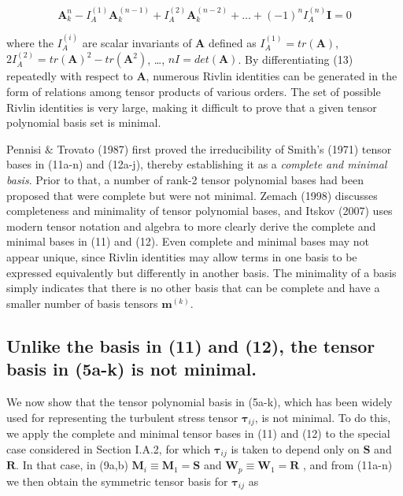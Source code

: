 %
\begin{equation}
	\label{E:30}
	\mathbf{A}^n_k - I^{(1)}_A \mathbf{A}^{(n-1)}_k + I^{(2)}_A \mathbf{A}^{(n-2)}_k
	+ \ldots + (-1)^{n}I^{(n)}_A \mathbf{I} = 0
\end{equation}
%
%   


where the  $I^{(i)}_{A}$ are scalar invariants of $\mathbf{A}$ defined as  $I^{(1)}_{A} = tr(\mathbf{A})$, $2I^{(2)}_{A} = tr(\mathbf{A})^2- tr(\mathbf{A}^2)$, \ldots , $nI = det(\mathbf{A})$. By differentiating (13) repeatedly with respect to $\mathbf{A}$, numerous Rivlin identities can be generated in the form of relations among tensor products of various orders. The set of possible Rivlin identities is very large, making it difficult to prove that a given tensor polynomial basis set is minimal. 

Pennisi $\&$ Trovato (1987) first proved the irreducibility of Smith’s (1971) tensor bases in (11a-n) and (12a-j), thereby establishing it as a \textit{complete and minimal basis}. Prior to that, a number of rank-2 tensor polynomial bases had been proposed that were complete but were not minimal. Zemach (1998) discusses completeness and minimality of tensor polynomial bases, and Itskov (2007) uses modern tensor notation and algebra to more clearly derive the complete and minimal bases in (11) and (12).  Even complete and minimal bases may not appear unique, since Rivlin identities may allow terms in one basis to be expressed equivalently but differently in another basis. The minimality of a basis simply indicates that there is no other basis that can be complete and have a smaller number of basis tensors $\mathbf{m}^{(k)}$. 

\subsection{Unlike the basis in (11) and (12), the tensor basis in (5a-k) is not minimal.}

We now show that the tensor polynomial basis in (5a-k), which has been widely used for representing the turbulent stress tensor $\mathbf{\tau}_{ij}$, is not minimal. To do this, we apply the complete and minimal tensor bases in (11) and (12) to the special case considered in Section I.A.2, for which $\mathbf{\tau}_{ij}$ is taken to depend only on $\mathbf{S}$ and $\mathbf{R}$.  In that case, in (9a,b) $\mathbf{M}_i \equiv \mathbf{M}_1 = \mathbf{S}$ and $\mathbf{W}_p \equiv \mathbf{W}_1 = \mathbf{R}$ , and from (11a-n) we then obtain the symmetric tensor basis for  $\mathbf{\tau}_{ij}$ as

